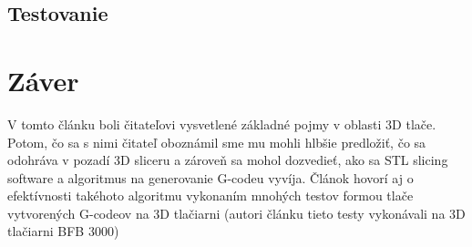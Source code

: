 \documentclass[10pt,twoside,slovak,a4paper]{article}
\begin{document}
\subsection{Testovanie}\label{Slicer_vyvoj:Testovanie}
\section{Záver}
    V tomto článku boli čitateľovi vysvetlené základné pojmy v oblasti 3D tlače. Potom, čo sa s nimi čitateľ oboznámil sme mu mohli hlbšie predložiť, čo sa odohráva v pozadí 3D sliceru a zároveň sa mohol dozvedieť, ako sa STL slicing software a algoritmus na generovanie G-codeu vyvíja. Článok hovorí aj o efektívnosti takéhoto algoritmu vykonaním mnohých testov formou tlače vytvorených G-codeov na 3D tlačiarni (autori článku \cite{6757836} tieto testy vykonávali na 3D tlačiarni BFB 3000) 

 
\end{document}
